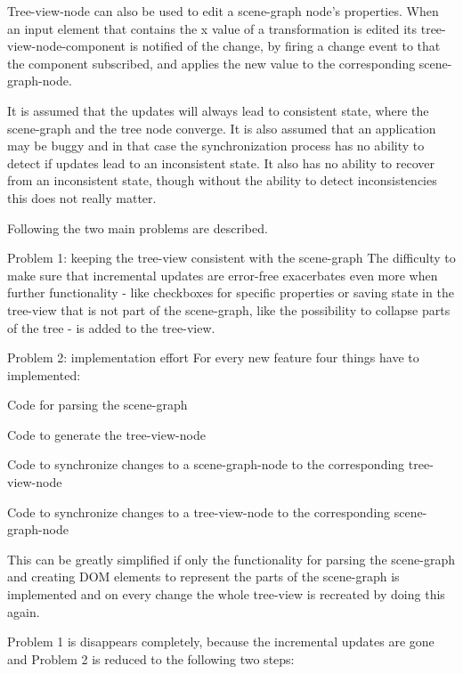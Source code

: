 Tree-view-node can also be used to edit a scene-graph node's properties. When an
input element that contains the x value of a transformation is edited its
tree-view-node-component is notified of the change, by firing a change event to
that the component subscribed, and applies the new value to the corresponding
scene-graph-node.

It is assumed that the updates will always lead to consistent state, where the
scene-graph and the tree node converge. It is also assumed that an application
may be buggy and in that case the synchronization process has no ability to
detect if updates lead to an inconsistent state. It also has no ability to
recover from an inconsistent state, though without the ability to detect
inconsistencies this does not really matter.

Following the two main problems are described.

\clearpage

\begin{description*}
  \item[Problem 1: keeping the tree-view consistent with the scene-graph]
    The difficulty to make sure that incremental updates are error-free
    exacerbates even more when further functionality - like checkboxes for
    specific properties or saving state in the tree-view that is not part of
    the scene-graph, like the possibility to collapse parts of the tree - is
    added to the tree-view.
  \item[Problem 2: implementation effort]
    For every new feature four things have to implemented:
    \begin{enumerate*}
      \item Code for parsing the scene-graph
      \item Code to generate the tree-view-node
      \item Code to synchronize changes to a scene-graph-node to the corresponding tree-view-node
      \item Code to synchronize changes to a tree-view-node to the corresponding scene-graph-node
    \end{enumerate*}
\end{description*}

This can be greatly simplified if only the functionality for parsing the
scene-graph and creating \gls{DOM} elements to represent the parts of the scene-graph
is implemented and on every change the whole tree-view is recreated by doing
this again.

Problem 1 is disappears completely, because the incremental updates are gone and
Problem 2 is reduced to the following two steps:

